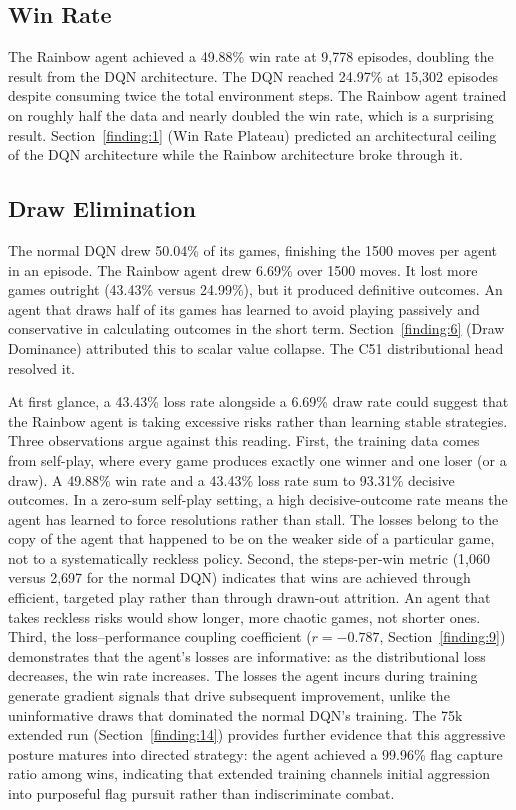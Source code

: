 \subsection{Win Rate }\label{finding:7}
The Rainbow agent achieved a 49.88\% win rate at 9,778 episodes, doubling the result from the DQN architecture. The DQN reached 24.97\% at 15,302 episodes despite consuming twice the total environment steps. The Rainbow agent trained on roughly half the data and nearly doubled the win rate, which is a surprising result. Section~\ref{finding:1} (Win Rate Plateau) predicted an architectural ceiling of the DQN architecture while the Rainbow architecture broke through it.

\subsection{Draw Elimination}\label{finding:8}
The normal DQN drew 50.04\% of its games, finishing the 1500 moves per agent in an episode. The Rainbow agent drew 6.69\% over 1500 moves. It lost more games outright (43.43\% versus 24.99\%), but it produced definitive outcomes. An agent that draws half of its games has learned to avoid playing passively and conservative in calculating outcomes in the short term. Section~\ref{finding:6} (Draw Dominance) attributed this to scalar value collapse. The C51 distributional head resolved it.

At first glance, a 43.43\% loss rate alongside a 6.69\% draw rate could suggest that the Rainbow agent is taking excessive risks rather than learning stable strategies. Three observations argue against this reading. First, the training data comes from self-play, where every game produces exactly one winner and one loser (or a draw). A 49.88\% win rate and a 43.43\% loss rate sum to 93.31\% decisive outcomes. In a zero-sum self-play setting, a high decisive-outcome rate means the agent has learned to force resolutions rather than stall. The losses belong to the copy of the agent that happened to be on the weaker side of a particular game, not to a systematically reckless policy. Second, the steps-per-win metric (1,060 versus 2,697 for the normal DQN) indicates that wins are achieved through efficient, targeted play rather than through drawn-out attrition. An agent that takes reckless risks would show longer, more chaotic games, not shorter ones. Third, the loss--performance coupling coefficient ($r = -0.787$, Section~\ref{finding:9}) demonstrates that the agent's losses are informative: as the distributional loss decreases, the win rate increases. The losses the agent incurs during training generate gradient signals that drive subsequent improvement, unlike the uninformative draws that dominated the normal DQN's training. The 75k extended run (Section~\ref{finding:14}) provides further evidence that this aggressive posture matures into directed strategy: the agent achieved a 99.96\% flag capture ratio among wins, indicating that extended training channels initial aggression into purposeful flag pursuit rather than indiscriminate combat.

